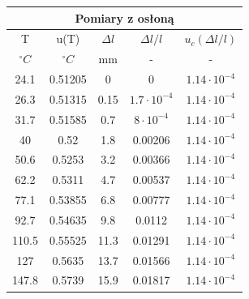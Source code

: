 \begin{center}
    \begin{tabular}{|c|c||c|c|c|}
        \hline
        \multicolumn{5}{|c|}{Pomiary z osłoną} \\
        \hline
        T     & u(T)    & $\Delta l$ & $\Delta l / l$  & $u_c(\Delta l / l)$ \\ \hline
        $^{\circ}C$ & $^{\circ}C$   & mm      & -          & -          \\ \hline
        24.1  & 0.51205 & 0       & 0          & $1.14 \cdot 10^{-4}$ \\ \hline
        26.3  & 0.51315 & 0.15    & $1.7 \cdot 10^{-4}$ & $1.14 \cdot 10^{-4}$ \\ \hline
        31.7  & 0.51585 & 0.7     & $8 \cdot 10^{-4}$       & $1.14 \cdot 10^{-4}$ \\ \hline
        40    & 0.52    & 1.8     & 0.00206    & $1.14 \cdot 10^{-4}$ \\ \hline
        50.6  & 0.5253  & 3.2     & 0.00366    & $1.14 \cdot 10^{-4}$ \\ \hline
        62.2  & 0.5311  & 4.7     & 0.00537    & $1.14 \cdot 10^{-4}$ \\ \hline
        77.1  & 0.53855 & 6.8     & 0.00777    & $1.14 \cdot 10^{-4}$ \\ \hline
        92.7  & 0.54635 & 9.8     & 0.0112     & $1.14 \cdot 10^{-4}$ \\ \hline
        110.5 & 0.55525 & 11.3    & 0.01291    & $1.14 \cdot 10^{-4}$ \\ \hline
        127   & 0.5635  & 13.7    & 0.01566    & $1.14 \cdot 10^{-4}$ \\ \hline
        147.8 & 0.5739  & 15.9    & 0.01817    & $1.14 \cdot 10^{-4}$ \\ \hline
    \end{tabular}
\end{center}

